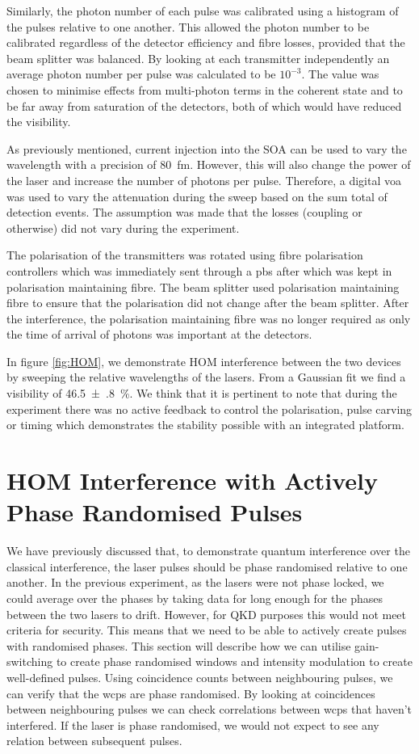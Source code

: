 Similarly, the photon number of each pulse was calibrated using a histogram of the pulses relative to one another. This allowed the photon number to be calibrated regardless of the detector efficiency and fibre losses, provided that the beam splitter was balanced. By looking at each transmitter independently an average photon number per pulse was calculated to be $10^{-3}$. The value was chosen to minimise effects from multi-photon terms in the coherent state and to be far away from saturation of the detectors, both of which would have reduced the visibility.

As previously mentioned, current injection into the \ac{SOA} can be used to vary the wavelength with a precision of \SI{80}{\femto\metre}. However, this will also change the power of the laser and increase the number of photons per pulse. Therefore, a digital \ac{voa} was used to vary the attenuation during the sweep based on the sum total of detection events. The assumption was made that the losses (coupling or otherwise) did not vary during the experiment. 

The polarisation of the transmitters was rotated using fibre polarisation controllers which was immediately sent through a \ac{pbs} after which was kept in polarisation maintaining fibre. The beam splitter used polarisation maintaining fibre to ensure that the polarisation did not change after the beam splitter. After the interference, the polarisation maintaining fibre was no longer required as only the time of arrival of photons was important at the detectors.

In figure \ref{fig:HOM}, we demonstrate \acl{HOM} interference between the two devices by sweeping the relative wavelengths of the lasers. From a Gaussian fit we find a visibility of \SI{46.5(8)}{\percent}. We think that it is pertinent to note that during the experiment there was no active feedback to control the polarisation, pulse carving or timing which demonstrates the stability possible with an integrated platform. 

\section{HOM Interference with Actively Phase Randomised Pulses}

We have previously discussed that, to demonstrate quantum interference over the classical interference, the laser pulses should be phase randomised relative to one another. In the previous experiment, as the lasers were not phase locked, we could average over the phases by taking data for long enough for the phases between the two lasers to drift. However, for \ac{QKD} purposes this would not meet criteria for security. This means that we need to be able to actively create pulses with randomised phases. This section will describe how we can utilise gain-switching to create phase randomised windows and intensity modulation to create well-defined pulses. Using coincidence counts between neighbouring pulses, we can verify that the  \acp{wcp} are phase randomised. By looking at coincidences between neighbouring pulses we can check correlations between \acp{wcp} that haven't interfered. If the laser is phase randomised, we would not expect to see any relation between subsequent pulses. 

